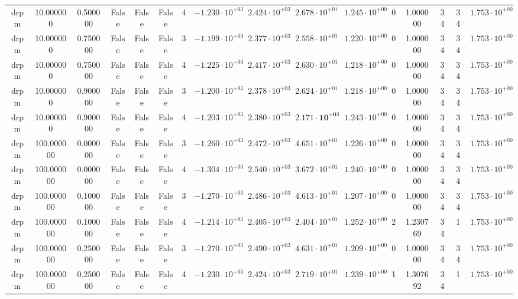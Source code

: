 \begin{table}
\begin{tabular}{cccccccccccccccc}
drpm & 10.000000 & 0.500000 & False & False & False & 4 & $-1.230 \cdot 10^{+03}$ & $2.424 \cdot 10^{+03}$ & $2.678 \cdot 10^{+01}$ & $1.245 \cdot 10^{+00}$ & 0 & 1.000000 & 34 & 34 & $1.753 \cdot 10^{+00}$ \\
drpm & 10.000000 & 0.750000 & False & False & False & 3 & $-1.199 \cdot 10^{+03}$ & $2.377 \cdot 10^{+03}$ & $2.558 \cdot 10^{+01}$ & $1.220 \cdot 10^{+00}$ & 0 & 1.000000 & 34 & 34 & $1.753 \cdot 10^{+00}$ \\
drpm & 10.000000 & 0.750000 & False & False & False & 4 & $-1.225 \cdot 10^{+03}$ & $2.417 \cdot 10^{+03}$ & $2.630 \cdot 10^{+01}$ & $1.218 \cdot 10^{+00}$ & 0 & 1.000000 & 34 & 34 & $1.753 \cdot 10^{+00}$ \\
drpm & 10.000000 & 0.900000 & False & False & False & 3 & $-1.200 \cdot 10^{+03}$ & $2.378 \cdot 10^{+03}$ & $2.624 \cdot 10^{+01}$ & $1.218 \cdot 10^{+00}$ & 0 & 1.000000 & 34 & 34 & $1.753 \cdot 10^{+00}$ \\
drpm & 10.000000 & 0.900000 & False & False & False & 4 & $-1.203 \cdot 10^{+03}$ & $2.380 \cdot 10^{+03}$ & $\mathbf{2.171 \cdot 10^{+01}}$ & $1.243 \cdot 10^{+00}$ & 0 & 1.000000 & 34 & 34 & $1.753 \cdot 10^{+00}$ \\
drpm & 100.000000 & 0.000000 & False & False & False & 3 & $-1.260 \cdot 10^{+03}$ & $2.472 \cdot 10^{+03}$ & $4.651 \cdot 10^{+01}$ & $1.226 \cdot 10^{+00}$ & 0 & 1.000000 & 34 & 34 & $1.753 \cdot 10^{+00}$ \\
drpm & 100.000000 & 0.000000 & False & False & False & 4 & $-1.304 \cdot 10^{+03}$ & $2.540 \cdot 10^{+03}$ & $3.672 \cdot 10^{+01}$ & $1.240 \cdot 10^{+00}$ & 0 & 1.000000 & 34 & 34 & $1.753 \cdot 10^{+00}$ \\
drpm & 100.000000 & 0.100000 & False & False & False & 3 & $-1.270 \cdot 10^{+03}$ & $2.486 \cdot 10^{+03}$ & $4.613 \cdot 10^{+01}$ & $1.207 \cdot 10^{+00}$ & 0 & 1.000000 & 34 & 34 & $1.753 \cdot 10^{+00}$ \\
drpm & 100.000000 & 0.100000 & False & False & False & 4 & $-1.214 \cdot 10^{+03}$ & $2.405 \cdot 10^{+03}$ & $2.404 \cdot 10^{+01}$ & $1.252 \cdot 10^{+00}$ & 2 & 1.230769 & 34 & 1 & $1.753 \cdot 10^{+00}$ \\
drpm & 100.000000 & 0.250000 & False & False & False & 3 & $-1.270 \cdot 10^{+03}$ & $2.490 \cdot 10^{+03}$ & $4.631 \cdot 10^{+01}$ & $1.209 \cdot 10^{+00}$ & 0 & 1.000000 & 34 & 34 & $1.753 \cdot 10^{+00}$ \\
drpm & 100.000000 & 0.250000 & False & False & False & 4 & $-1.230 \cdot 10^{+03}$ & $2.424 \cdot 10^{+03}$ & $2.719 \cdot 10^{+01}$ & $1.239 \cdot 10^{+00}$ & 1 & 1.307692 & 34 & 1 & $1.753 \cdot 10^{+00}$ \\

\end{tabular}
\end{table}
